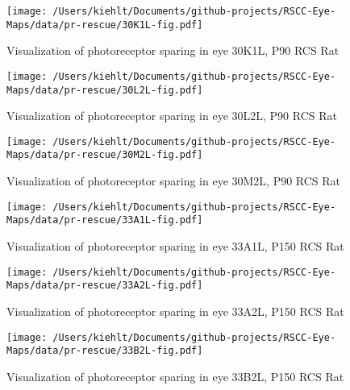 \documentclass{article}
\begin{document}
\begin{center}
\begin{figure}
\texttt{[image: /Users/kiehlt/Documents/github-projects/RSCC-Eye-Maps/data/pr-rescue/30K1L-fig.pdf]}
\caption{Visualization of photoreceptor sparing in eye 30K1L, P90 RCS Rat}
\label{fig:30K1L}
\end{figure}

\end{center}
\begin{center}
\begin{figure}
\texttt{[image: /Users/kiehlt/Documents/github-projects/RSCC-Eye-Maps/data/pr-rescue/30L2L-fig.pdf]}
\caption{Visualization of photoreceptor sparing in eye 30L2L, P90 RCS Rat}
\label{fig:30L2L}
\end{figure}

\end{center}
\begin{center}
\begin{figure}
\texttt{[image: /Users/kiehlt/Documents/github-projects/RSCC-Eye-Maps/data/pr-rescue/30M2L-fig.pdf]}
\caption{Visualization of photoreceptor sparing in eye 30M2L, P90 RCS Rat}
\label{fig:30M2L}
\end{figure}

\end{center}
\begin{center}
\begin{figure}
\texttt{[image: /Users/kiehlt/Documents/github-projects/RSCC-Eye-Maps/data/pr-rescue/33A1L-fig.pdf]}
\caption{Visualization of photoreceptor sparing in eye 33A1L, P150 RCS Rat}
\label{fig:33A1L}
\end{figure}

\end{center}
\begin{center}
\begin{figure}
\texttt{[image: /Users/kiehlt/Documents/github-projects/RSCC-Eye-Maps/data/pr-rescue/33A2L-fig.pdf]}
\caption{Visualization of photoreceptor sparing in eye 33A2L, P150 RCS Rat}
\label{fig:33A2L}
\end{figure}

\end{center}
\begin{center}
\begin{figure}
\texttt{[image: /Users/kiehlt/Documents/github-projects/RSCC-Eye-Maps/data/pr-rescue/33B2L-fig.pdf]}
\caption{Visualization of photoreceptor sparing in eye 33B2L, P150 RCS Rat}
\label{fig:33B2L}
\end{figure}

\end{center}
\end{document}
